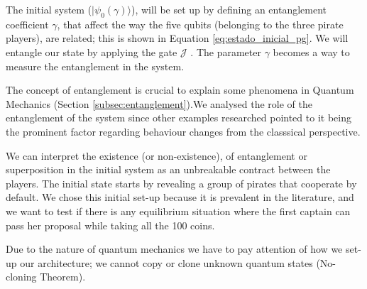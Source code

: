 The initial system ($\vert \psi_{0}(\gamma) \rangle$), will be set up by defining an entanglement coefficient $\gamma$, that affect the way the five qubits (belonging to the three pirate players), are related; this is shown in Equation \ref{eq:estado_inicial_pg}. 
We will entangle our state by applying the gate $\mathcal{J}$ \cite{Letters2002}. The parameter $\gamma$ becomes a way to measure the entanglement in the system\cite{Eisert2008}. 

The concept of entanglement is crucial to explain some phenomena in Quantum Mechanics (Section \ref{subsec:entanglement}).We analysed the role of the entanglement of the system since other examples researched pointed to it being the prominent factor regarding behaviour changes from the classsical perspective\cite{Fra2011a}\cite{Fra2011}\cite{Letters2002}\cite{Khan2011}\cite{Ricketts2006}. 

We can interpret the existence (or non-existence), of entanglement or superposition in the initial system as an unbreakable contract between the players\cite{Piotrowski}. The initial state starts by revealing a group of pirates that cooperate by default. We chose this initial set-up because it is prevalent in the literature\cite{Eisert2008}\cite{Fra2011a}\cite{Fra2011}\cite{Letters2002}, and we want to test if there is any equilibrium situation where the first captain can pass her proposal while taking all the 100 coins. 



Due to the nature of quantum mechanics we have to pay attention of how we set-up our architecture; we cannot copy or clone unknown quantum states (No-cloning Theorem)\cite{Rieffel2011}. 




